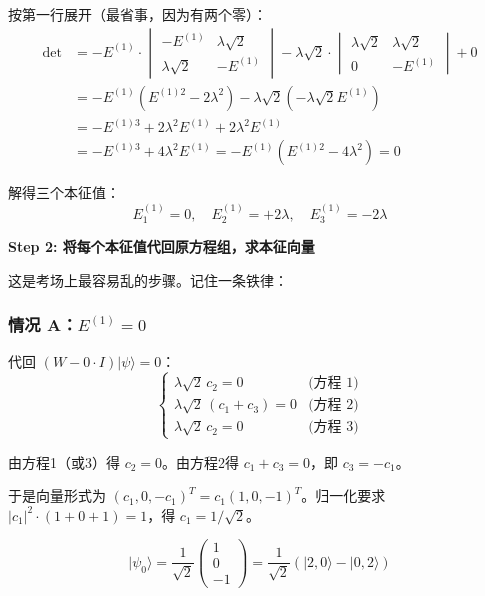 按第一行展开（最省事，因为有两个零）：
\begin{align*}
\det &= -E^{(1)} \cdot \begin{vmatrix} -E^{(1)} & \lambda\sqrt{2} \\ \lambda\sqrt{2} & -E^{(1)} \end{vmatrix}
- \lambda\sqrt{2} \cdot \begin{vmatrix} \lambda\sqrt{2} & \lambda\sqrt{2} \\ 0 & -E^{(1)} \end{vmatrix}
+ 0 \\
&= -E^{(1)} \left( E^{(1)2} - 2\lambda^2 \right) - \lambda\sqrt{2} \left( -\lambda\sqrt{2} E^{(1)} \right) \\
&= -E^{(1)3} + 2\lambda^2 E^{(1)} + 2\lambda^2 E^{(1)} \\
&= -E^{(1)3} + 4\lambda^2 E^{(1)} = -E^{(1)}(E^{(1)2} - 4\lambda^2) = 0
\end{align*}

解得三个本征值：
\[
\boxed{E^{(1)}_1 = 0, \quad E^{(1)}_2 = +2\lambda, \quad E^{(1)}_3 = -2\lambda}
\]

\textbf{Step 2: 将每个本征值代回原方程组，求本征向量}

这是考场上最容易乱的步骤。记住一条铁律：

\subsubsection*{情况 A：$E^{(1)} = 0$}

代回 $(W - 0 \cdot I)|\psi\rangle = 0$：
\[
\begin{cases}
\lambda\sqrt{2} \, c_2 = 0 & \text{(方程 1)} \\
\lambda\sqrt{2} \, (c_1 + c_3) = 0 & \text{(方程 2)} \\
\lambda\sqrt{2} \, c_2 = 0 & \text{(方程 3)}
\end{cases}
\]

由方程1（或3）得 $c_2 = 0$。由方程2得 $c_1 + c_3 = 0$，即 $c_3 = -c_1$。

于是向量形式为 $(c_1, 0, -c_1)^T = c_1 (1, 0, -1)^T$。归一化要求 $|c_1|^2 \cdot (1+0+1) = 1$，得 $c_1 = 1/\sqrt{2}$。

\[
\boxed{|\psi_0\rangle = \frac{1}{\sqrt{2}}\begin{pmatrix} 1 \\ 0 \\ -1 \end{pmatrix} = \frac{1}{\sqrt{2}}(|2,0\rangle - |0,2\rangle)}
\]

